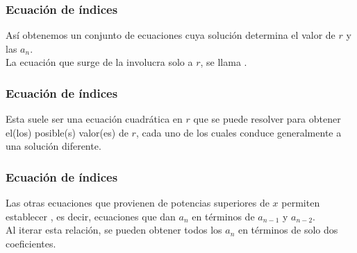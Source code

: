 \documentclass[12pt]{beamer}
\begin{document}
\begin{frame}
\frametitle{Ecuación de índices}
Así obtenemos un conjunto de ecuaciones cuya solución determina el valor de $r$ y las $a_{n}$.
\\
\bigskip
\pause
La ecuación que surge de la  involucra solo a $r$, se llama .
\end{frame}
\begin{frame}
\frametitle{Ecuación de índices}
Esta suele ser una ecuación cuadrática en $r$ que se puede resolver para obtener el(los) posible(s) valor(es) de $r$, cada uno de los cuales conduce generalmente a una solución diferente.
\end{frame}
\begin{frame}
\frametitle{Ecuación de índices}
Las otras ecuaciones que provienen de potencias superiores de $x$ permiten establecer , es decir, ecuaciones que dan $a_{n}$ en términos de $a_{n-1}$ y $a_{n-2}$.
\\
\bigskip
Al iterar esta relación, se pueden obtener todos los $a_{n}$ en términos de solo dos coeficientes.
\end{frame}
\end{document}
